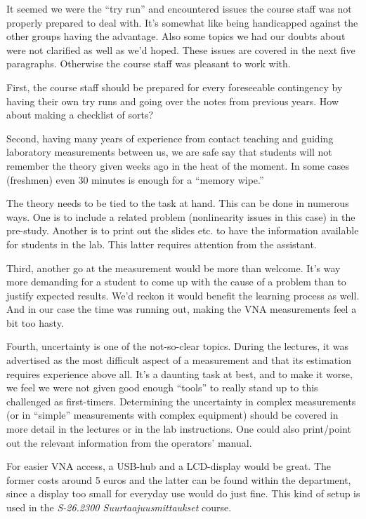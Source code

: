 \documentclass[a4paper, 12pt]{article}
\begin{document}
It seemed we were the ``try run'' and encountered issues the course 
staff was not properly prepared to deal with. It's somewhat like being 
handicapped against the other groups having the advantage. Also some 
topics we had our doubts about were not clarified as well as we'd hoped. 
These issues are covered in the next five paragraphs. Otherwise the 
course staff was pleasant to work with.

First, the course staff should be prepared for every foreseeable 
contingency by having their own try runs and going over the notes 
from previous years. How about making a checklist of sorts?

Second, having many years of experience from contact teaching and 
guiding laboratory measurements between us, we are safe say that 
students will not remember the theory given weeks ago in the heat 
of the moment. In some cases (freshmen) even 30 minutes is enough 
for a ``memory wipe.''

The theory needs to be tied to the task at hand. This can be done in 
numerous ways. One is to include a related problem (nonlinearity issues 
in this case) in the pre-study. Another is to print out the slides etc. 
to have the information available for students in the lab. This latter 
requires attention from the assistant.

Third, another go at the measurement would be more than welcome. It's 
way more demanding for a student to come up with the cause of a problem 
than to justify expected results. We'd reckon it would benefit the learning 
process as well. And in our case the time was running out, making the 
VNA measurements feel a bit too hasty.

Fourth, uncertainty is one of the not-so-clear topics. During the lectures, 
it was advertised as the most difficult aspect of a measurement and that 
its estimation requires experience above all. It's a daunting task at best, 
and to make it worse, we feel we were not given good enough ``tools'' to really
stand up to this challenged as first-timers. Determining the uncertainty in 
complex measurements (or in ``simple'' measurements with complex equipment) 
should be covered in more detail in the lectures or in the lab instructions. 
One could also print/point out the relevant information from the operators' 
manual. 

For easier VNA access, a USB-hub and a LCD-display would be great. 
The former costs around 5 euros and the latter can be found within 
the department, since a display too small for everyday use would do 
just fine. This kind of setup is used in the 
\textit{S-26.2300 Suurtaajuusmittaukset} course.
\end{document}
